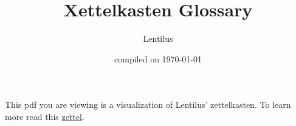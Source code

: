 \documentclass[a4paper]{article}
\title{Xettelkasten Glossary}
\author{Lentilus}
\date{compiled on \today}
\begin{document}
\maketitle

\begin{mdframed}[nobreak=true, topline=false,bottomline=false, rightline=false]
   This pdf you are viewing is a visualization of Lentilus' zettelkasten. To learn more read this \hyperlink{Intro}{zettel}.
\end{mdframed}
\newpage

\end{document}

